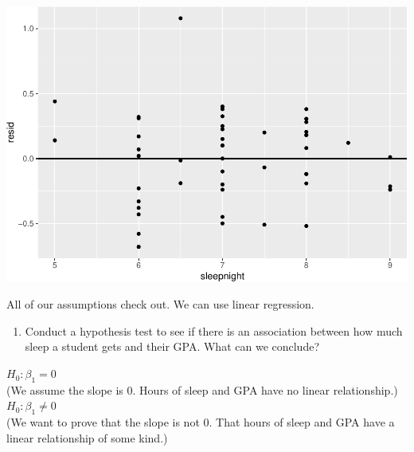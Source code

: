 \documentclass[]{article}
\newenvironment{Shaded}{\begin{snugshade}}{\end{snugshade}}
\newcommand{\DataTypeTok}[1]{\textcolor[rgb]{0.13,0.29,0.53}{#1}}
\newcommand{\DecValTok}[1]{\textcolor[rgb]{0.00,0.00,0.81}{#1}}
\newcommand{\KeywordTok}[1]{\textcolor[rgb]{0.13,0.29,0.53}{\textbf{#1}}}
\newcommand{\NormalTok}[1]{#1}
\newcommand{\OperatorTok}[1]{\textcolor[rgb]{0.81,0.36,0.00}{\textbf{#1}}}
\newcommand{\StringTok}[1]{\textcolor[rgb]{0.31,0.60,0.02}{#1}}
\providecommand{\tightlist}{%
  \setlength{\itemsep}{0pt}\setlength{\parskip}{0pt}}
\begin{document}
\begin{Shaded}
\end{Shaded}

\includegraphics{lab-8-regression_files/figure-latex/unnamed-chunk-10-1.pdf}

All of our assumptions check out. We can use linear regression.

\newpage

\begin{enumerate}
\def\labelenumi{\arabic{enumi}.}
\setcounter{enumi}{7}
\tightlist
\item
  Conduct a hypothesis test to see if there is an association between
  how much sleep a student gets and their GPA. What can we conclude?
\end{enumerate}

\(H_0: \beta_1 = 0\)\\
(We assume the slope is 0. Hours of sleep and GPA have no linear
relationship.)\\
\(H_0: \beta_1\ne0\)\\
(We want to prove that the slope is not 0. That hours of sleep and GPA
have a linear relationship of some kind.)

\begin{Shaded}
\end{Shaded}
\end{document}
